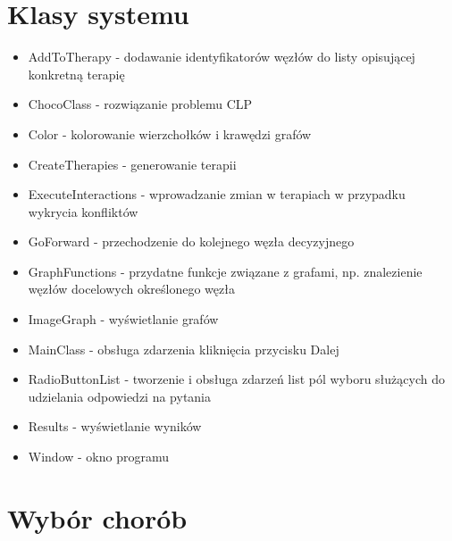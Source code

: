 \section{Klasy systemu}
\begin{itemize}
\item{AddToTherapy - dodawanie identyfikatorów węzłów do listy opisującej konkretną terapię}
\item{ChocoClass - rozwiązanie problemu CLP}
\item{Color - kolorowanie wierzchołków i krawędzi grafów}
\item{CreateTherapies - generowanie terapii}
\item{ExecuteInteractions - wprowadzanie zmian w terapiach w przypadku wykrycia konfliktów}
\item{GoForward - przechodzenie do kolejnego węzła decyzyjnego}
\item{GraphFunctions - przydatne funkcje związane z grafami, np. znalezienie węzłów docelowych określonego węzła}
\item{ImageGraph - wyświetlanie grafów}
\item{MainClass - obsługa zdarzenia kliknięcia przycisku Dalej}
\item{RadioButtonList - tworzenie i obsługa zdarzeń list pól wyboru służących do udzielania odpowiedzi na pytania}
\item{Results - wyświetlanie wyników}
\item{Window - okno programu}
\end{itemize}

\section{Wybór chorób}

